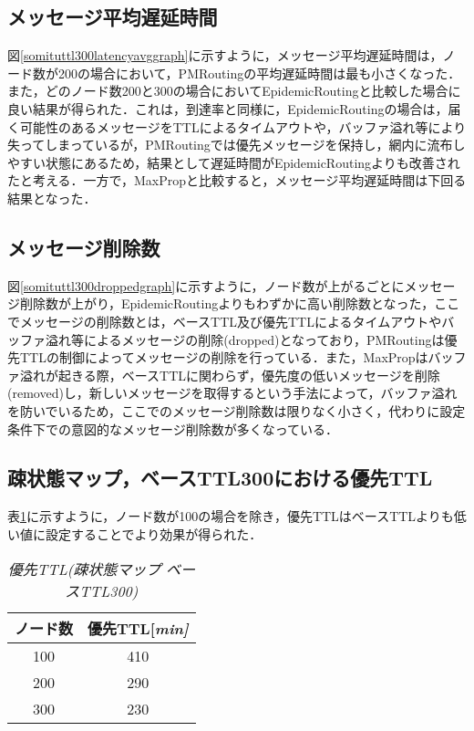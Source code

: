 \documentclass[11pt]{icsthesis}
\begin{document}
\subsection{メッセージ平均遅延時間}
図\ref{somituttl300latencyavggraph}に示すように，メッセージ平均遅延時間は，ノード数が200の場合において，PMRoutingの平均遅延時間は最も小さくなった．また，どのノード数200と300の場合においてEpidemicRoutingと比較した場合に良い結果が得られた．これは，到達率と同様に，EpidemicRoutingの場合は，届く可能性のあるメッセージをTTLによるタイムアウトや，バッファ溢れ等により失ってしまっているが，PMRoutingでは優先メッセージを保持し，網内に流布しやすい状態にあるため，結果として遅延時間がEpidemicRoutingよりも改善されたと考える．一方で，MaxPropと比較すると，メッセージ平均遅延時間は下回る結果となった．\\

\subsection{メッセージ削除数}
図\ref{somituttl300droppedgraph}に示すように，ノード数が上がるごとにメッセージ削除数が上がり，EpidemicRoutingよりもわずかに高い削除数となった，ここでメッセージの削除数とは，ベースTTL及び優先TTLによるタイムアウトやバッファ溢れ等によるメッセージの削除(dropped)となっており，PMRoutingは優先TTLの制御によってメッセージの削除を行っている．また，MaxPropはバッファ溢れが起きる際，ベースTTLに関わらず，優先度の低いメッセージを削除(removed)し，新しいメッセージを取得するという手法によって，バッファ溢れを防いでいるため，ここでのメッセージ削除数は限りなく小さく，代わりに設定条件下での意図的なメッセージ削除数が多くなっている．\\
\subsection{疎状態マップ，ベースTTL300における優先TTL}
表\ref{priorityTTL_somitsu300}に示すように，ノード数が100の場合を除き，優先TTLはベースTTLよりも低い値に設定することでより効果が得られた．
\begin{table}[H]
	\begin{center}
			 \caption[]{\it{優先TTL(疎状態マップ ベースTTL300)}}
			 \label{priorityTTL_somitsu300}
			 \begin{tabular}{|c|c|}
 \hline
 ノード数&優先TTL[\it{min}]\\
 \hline
 100&410\\
 \hline
 200&290\\
 \hline
 300&230\\
 \hline
			 \end{tabular}
		 \end{center}
 \end{table}
\newpage
\end{document}
